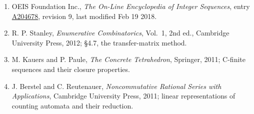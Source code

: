 \documentclass[11pt]{article}
\theoremstyle{definition}
\begin{document}
\begin{enumerate}

\item OEIS Foundation Inc., \emph{The On-Line Encyclopedia of Integer Sequences}, entry \href{https://oeis.org/A204678}{A204678}, revision 9, last modified Feb 19 2018.

\item R. P. Stanley, \emph{Enumerative Combinatorics}, Vol.~1, 2nd ed., Cambridge University Press, 2012; \S4.7, the transfer-matrix method.

\item M. Kauers and P. Paule, \emph{The Concrete Tetrahedron}, Springer, 2011; C-finite sequences and their closure properties.

\item J. Berstel and C. Reutenauer, \emph{Noncommutative Rational Series with Applications}, Cambridge University Press, 2011; linear representations of counting automata and their reduction.

\end{enumerate}
\end{document}
